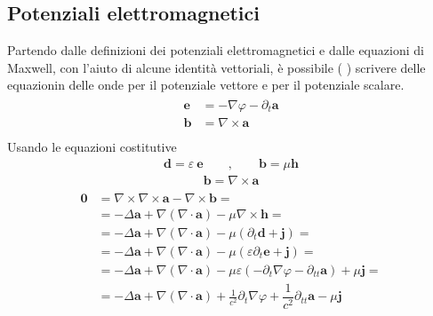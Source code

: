 \documentclass[letterpaper,10pt,english]{jupyterBook}
\begin{document}
\subsection{Potenziali elettromagnetici}
\label{\detokenize{ch/waves-equation:potenziali-elettromagnetici}}
\sphinxAtStartPar
Partendo dalle definizioni dei potenziali elettromagnetici e dalle equazioni di Maxwell, con l’aiuto di alcune identità vettoriali, è possibile ( ) scrivere delle equazionin delle onde per il potenziale vettore e per il potenziale scalare.
\begin{equation*}
\begin{split}\begin{aligned}
 \mathbf{e} & = - \nabla \varphi - \partial_t \mathbf{a} \\
 \mathbf{b} & = \nabla \times \mathbf{a} \\
\end{aligned}\end{split}
\end{equation*}
\sphinxAtStartPar
Usando le equazioni costitutive
\begin{equation*}
\begin{split}\mathbf{d} = \varepsilon \ \mathbf{e} \qquad , \qquad
\mathbf{b} = \mu \mathbf{h} \end{split}
\end{equation*}
\sphinxAtStartPar
{}
\begin{equation*}
\begin{split}\mathbf{b} = \nabla \times \mathbf{a}\end{split}
\end{equation*}\begin{equation*}
\begin{split}\begin{aligned}
\mathbf{0} & = \nabla \times \nabla \times \mathbf{a} - \nabla \times \mathbf{b} = \\
 & = - \Delta \mathbf{a} + \nabla(\nabla \cdot \mathbf{a})  - \mu \nabla \times \mathbf{h} = \\
 & = - \Delta \mathbf{a} + \nabla(\nabla \cdot \mathbf{a})  - \mu ( \partial_t \mathbf{d} + \mathbf{j} )  = \\
 & = - \Delta \mathbf{a} + \nabla(\nabla \cdot \mathbf{a})  - \mu ( \varepsilon \partial_t \mathbf{e} + \mathbf{j} )  = \\
 & = - \Delta \mathbf{a} + \nabla(\nabla \cdot \mathbf{a})  - \mu \varepsilon ( - \partial_t \nabla \varphi - \partial_{tt} \mathbf{a} ) + \mu \mathbf{j} = \\
 & = - \Delta \mathbf{a} + \nabla(\nabla \cdot \mathbf{a})  + \frac{1}{c^2} \partial_t \nabla \varphi + \dfrac{1}{c^2} \partial_{tt} \mathbf{a} - \mu \mathbf{j}  \\
\end{aligned}\end{split}
\end{equation*}
\end{document}
